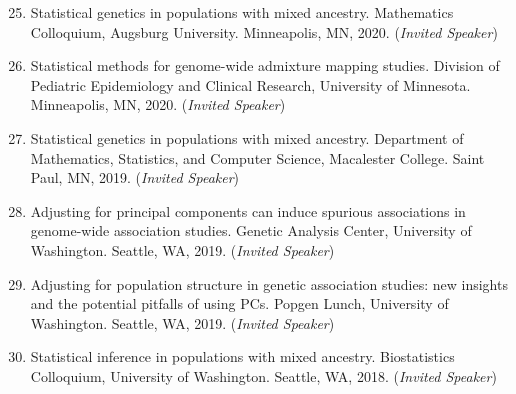 \documentclass[margin]{res}
\newenvironment{benumerate}[1]{
    \let\oldItem\item
    \def\item{\addtocounter{enumi}{-2}\oldItem}
    
    \begin{enumerate}
    \setcounter{enumi}{#1}
    \addtocounter{enumi}{1}
}{
    \end{enumerate}
}
\begin{document}
\begin{resume}
\begin{benumerate}{24}
\item Statistical genetics in populations with mixed ancestry. Mathematics Colloquium, Augsburg University. Minneapolis, MN, 2020. (\textit{Invited Speaker})

\item Statistical methods for genome-wide admixture mapping studies. Division of Pediatric Epidemiology and Clinical Research, University of Minnesota. Minneapolis, MN, 2020. (\textit{Invited Speaker})

\item Statistical genetics in populations with mixed ancestry. Department of Mathematics, Statistics, and Computer Science, Macalester College. Saint Paul, MN, 2019. (\textit{Invited Speaker})


\item Adjusting for principal components can induce spurious associations in genome-wide association studies. Genetic Analysis Center, University of Washington. Seattle, WA, 2019. (\textit{Invited Speaker})

\item Adjusting for population structure in genetic association studies: new insights and the potential pitfalls of using PCs. Popgen Lunch, University of Washington. Seattle, WA, 2019.  (\textit{Invited Speaker})




\item %
Statistical inference in populations with mixed ancestry. Biostatistics Colloquium, University of Washington. Seattle, WA, 2018.  (\textit{Invited Speaker})


\end{benumerate}
\end{resume}
\end{document}
